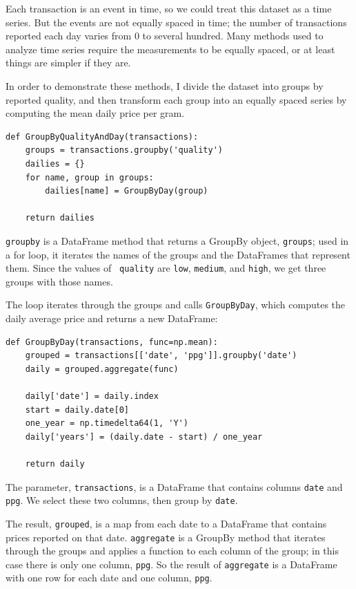 \documentclass[12pt]{book}
\begin{document}
Each transaction is an event in time, so we could treat this dataset
as a time series.  But the events are not equally spaced in time; the
number of transactions reported each day varies from 0 to several
hundred.  Many methods used to analyze time series require the
measurements to be equally spaced, or at least things are simpler if
they are.

In order to demonstrate these methods, I divide the dataset
into groups by reported quality, and then transform each group into
an equally spaced series by computing the mean daily price per gram.

\begin{verbatim}
def GroupByQualityAndDay(transactions):
    groups = transactions.groupby('quality')
    dailies = {}
    for name, group in groups:
        dailies[name] = GroupByDay(group)        

    return dailies
\end{verbatim}

{\tt groupby} is a DataFrame method that returns a GroupBy object,
{\tt groups}; used in a for loop, it iterates the names of the groups
and the DataFrames that represent them.  Since the values of {\tt
  quality} are {\tt low}, {\tt medium}, and {\tt high}, we get three
groups with those names.   

The loop iterates through the groups and calls {\tt GroupByDay},
which computes the daily average price and returns a new DataFrame:

\begin{verbatim}
def GroupByDay(transactions, func=np.mean):
    grouped = transactions[['date', 'ppg']].groupby('date')
    daily = grouped.aggregate(func)

    daily['date'] = daily.index
    start = daily.date[0]
    one_year = np.timedelta64(1, 'Y')
    daily['years'] = (daily.date - start) / one_year

    return daily
\end{verbatim}

The parameter, {\tt transactions}, is a DataFrame that contains
columns {\tt date} and {\tt ppg}.  We select these two
columns, then group by {\tt date}.

The result, {\tt grouped}, is a map from each date to a DataFrame that
contains prices reported on that date.  {\tt aggregate} is a
GroupBy method that iterates through the groups and applies a
function to each column of the group; in this case there is only one
column, {\tt ppg}.  So the result of {\tt aggregate} is a DataFrame
with one row for each date and one column, {\tt ppg}.
\end{document}
